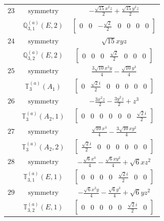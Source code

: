 \documentclass[fleqn,8pt,landscape]{jsarticle}
\begin{document}
\begin{longtable}{ccc}
$ 23 $ & $ \text{symmetry} $ & $ - \frac{\sqrt{15} x^{2} z}{2} + \frac{\sqrt{15} y^{2} z}{2} $ \\
$  $ & $ \mathbb{Q}_{3,1}^{(a)}(E,2) $ & $ \begin{bmatrix} 0 & 0 & - \frac{\sqrt{2}}{2} & 0 & 0 & 0 & 0 \end{bmatrix} $ \\ \hline
$ 24 $ & $ \text{symmetry} $ & $ \sqrt{15} x y z $ \\
$  $ & $ \mathbb{Q}_{3,2}^{(a)}(E,2) $ & $ \begin{bmatrix} 0 & 0 & 0 & \frac{\sqrt{2}}{2} & 0 & 0 & 0 \end{bmatrix} $ \\ \hline
$ 25 $ & $ \text{symmetry} $ & $ \frac{3 \sqrt{10} x^{2} y}{4} - \frac{\sqrt{10} y^{3}}{4} $ \\
$  $ & $ \mathbb{T}_{3}^{(a)}(A_{1}) $ & $ \begin{bmatrix} 0 & \frac{\sqrt{2} i}{2} & 0 & 0 & 0 & 0 & 0 \end{bmatrix} $ \\ \hline
$ 26 $ & $ \text{symmetry} $ & $ - \frac{3 x^{2} z}{2} - \frac{3 y^{2} z}{2} + z^{3} $ \\
$  $ & $ \mathbb{T}_{3}^{(a)}(A_{2},1) $ & $ \begin{bmatrix} 0 & 0 & 0 & 0 & 0 & 0 & \frac{\sqrt{2} i}{2} \end{bmatrix} $ \\ \hline
$ 27 $ & $ \text{symmetry} $ & $ \frac{\sqrt{10} x^{3}}{4} - \frac{3 \sqrt{10} x y^{2}}{4} $ \\
$  $ & $ \mathbb{T}_{3}^{(a)}(A_{2},2) $ & $ \begin{bmatrix} \frac{\sqrt{2} i}{2} & 0 & 0 & 0 & 0 & 0 & 0 \end{bmatrix} $ \\ \hline
$ 28 $ & $ \text{symmetry} $ & $ - \frac{\sqrt{6} x^{3}}{4} - \frac{\sqrt{6} x y^{2}}{4} + \sqrt{6} x z^{2} $ \\
$  $ & $ \mathbb{T}_{3,1}^{(a)}(E,1) $ & $ \begin{bmatrix} 0 & 0 & 0 & 0 & \frac{\sqrt{2} i}{2} & 0 & 0 \end{bmatrix} $ \\ \hline
$ 29 $ & $ \text{symmetry} $ & $ - \frac{\sqrt{6} x^{2} y}{4} - \frac{\sqrt{6} y^{3}}{4} + \sqrt{6} y z^{2} $ \\
$  $ & $ \mathbb{T}_{3,2}^{(a)}(E,1) $ & $ \begin{bmatrix} 0 & 0 & 0 & 0 & 0 & \frac{\sqrt{2} i}{2} & 0 \end{bmatrix} $ \\ \hline

\end{longtable}
\end{document}

